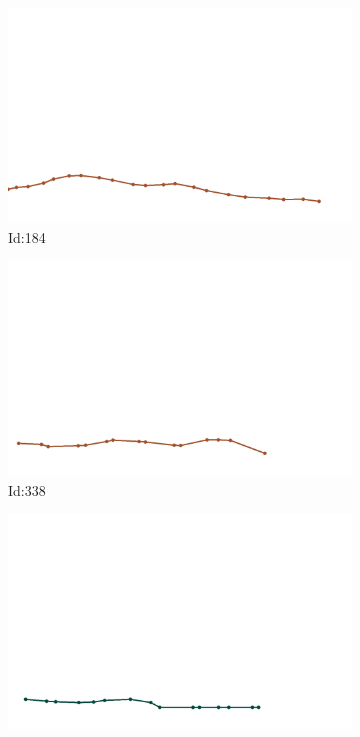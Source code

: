 \documentclass[12pt,twoside]{report}
\begin{document}
\begin{figure}
\centering
\begin{subfigure}[b]{0.20\textwidth}
\centering
\includegraphics[width=\textwidth]{../../trajectories/184.png}
\caption{Id:184}
\end{subfigure}
\begin{subfigure}[b]{0.20\textwidth}
\centering
\includegraphics[width=\textwidth]{../../trajectories/338.png}
\caption{Id:338}
\end{subfigure}
\begin{subfigure}[b]{0.20\textwidth}
\centering
\includegraphics[width=\textwidth]{../../trajectories/346.png}

\end{subfigure}
\end{figure}
\end{document}

